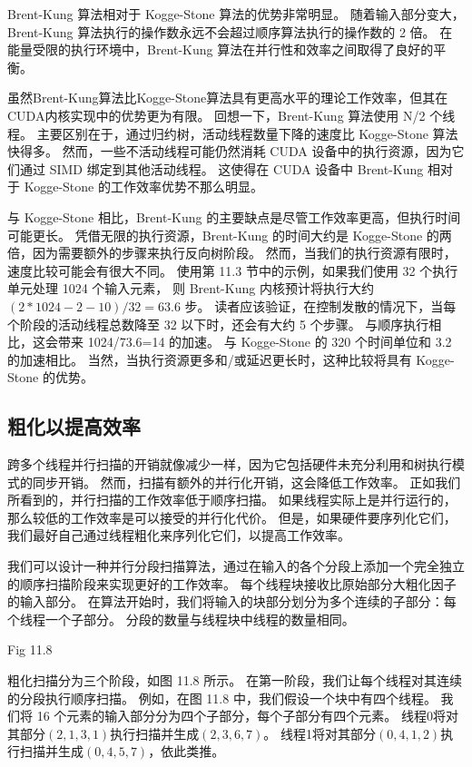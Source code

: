 Brent-Kung 算法相对于 Kogge-Stone 算法的优势非常明显。 
随着输入部分变大，Brent-Kung 算法执行的操作数永远不会超过顺序算法执行的操作数的 2 倍。 
在能量受限的执行环境中，Brent-Kung 算法在并行性和效率之间取得了良好的平衡。

虽然Brent-Kung算法比Kogge-Stone算法具有更高水平的理论工作效率，但其在CUDA内核实现中的优势更为有限。 
回想一下，Brent-Kung 算法使用 N/2 个线程。 主要区别在于，通过归约树，活动线程数量下降的速度比 Kogge-Stone 算法快得多。 
然而，一些不活动线程可能仍然消耗 CUDA 设备中的执行资源，因为它们通过 SIMD 绑定到其他活动线程。 
这使得在 CUDA 设备中 Brent-Kung 相对于 Kogge-Stone 的工作效率优势不那么明显。

与 Kogge-Stone 相比，Brent-Kung 的主要缺点是尽管工作效率更高，但执行时间可能更长。 
凭借无限的执行资源，Brent-Kung 的时间大约是 Kogge-Stone 的两倍，因为需要额外的步骤来执行反向树阶段。 
然而，当我们的执行资源有限时，速度比较可能会有很大不同。 
使用第 11.3 节中的示例，如果我们使用 32 个执行单元处理 1024 个输入元素，
则 Brent-Kung 内核预计将执行大约 $(2 * 1024-2-10) / 32=63.6$ 步。 
读者应该验证，在控制发散的情况下，当每个阶段的活动线程总数降至 32 以下时，还会有大约 5 个步骤。 
与顺序执行相比，这会带来 1024/73.6=14 的加速。 与 Kogge-Stone 的 320 个时间单位和 3.2 的加速相比。 
当然，当执行资源更多和/或延迟更长时，这种比较将具有 Kogge-Stone 的优势。

\subsection{粗化以提高效率}
跨多个线程并行扫描的开销就像减少一样，因为它包括硬件未充分利用和树执行模式的同步开销。 
然而，扫描有额外的并行化开销，这会降低工作效率。 正如我们所看到的，并行扫描的工作效率低于顺序扫描。 
如果线程实际上是并行运行的，那么较低的工作效率是可以接受的并行化代价。 
但是，如果硬件要序列化它们，我们最好自己通过线程粗化来序列化它们，以提高工作效率。

我们可以设计一种并行分段扫描算法，通过在输入的各个分段上添加一个完全独立的顺序扫描阶段来实现更好的工作效率。 
每个线程块接收比原始部分大粗化因子的输入部分。 
在算法开始时，我们将输入的块部分划分为多个连续的子部分：每个线程一个子部分。 分段的数量与线程块中线程的数量相同。

{\color{red} Fig 11.8}

粗化扫描分为三个阶段，如图 11.8 所示。 在第一阶段，我们让每个线程对其连续的分段执行顺序扫描。 
例如，在图 11.8 中，我们假设一个块中有四个线程。 我们将 16 个元素的输入部分分为四个子部分，每个子部分有四个元素。 
线程0将对其部分$(2,1,3,1)$执行扫描并生成$(2,3,6,7)$。 
线程1将对其部分$(0,4,1,2)$执行扫描并生成$(0,4,5,7)$，依此类推。

